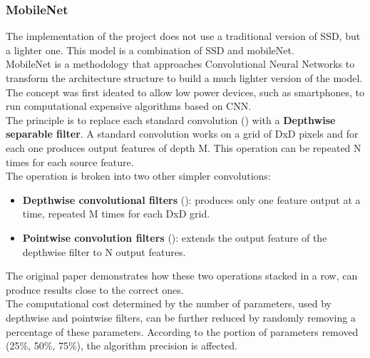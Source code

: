 \subsubsection*{MobileNet}
The implementation of the project does not use a traditional version of SSD, but a lighter one. This model is a combination of SSD and mobileNet\cite{mobilenet}.\\
MobileNet is a methodology that approaches Convolutional Neural Networks to transform the architecture structure to build a much lighter version of the model. The concept was first ideated to allow low power devices, such as smartphones, to run computational expensive algorithms based on CNN.\\
The principle is to replace each standard convolution () with a \textbf{Depthwise separable filter}. A standard convolution works on a grid of DxD pixels and for each one produces output features of depth M. This operation can be repeated N times for each source feature.\\
The operation is broken into two other simpler convolutions:
\begin{itemize}
	\item \textbf{Depthwise convolutional filters} (): produces only one feature output at a time, repeated M times for each DxD grid.
	\item \textbf{Pointwise convolution filters} (): extends the output feature of the depthwise filter to N output features.
\end{itemize}
The original paper demonstrates how these two operations stacked in a row, can produce results close to the correct ones.\\
The computational cost determined by the number of parameters, used by depthwise and pointwise filters, can be further reduced by randomly removing a percentage of these parameters. According to the portion of parameters removed (25\%, 50\%, 75\%), the algorithm precision is affected.

